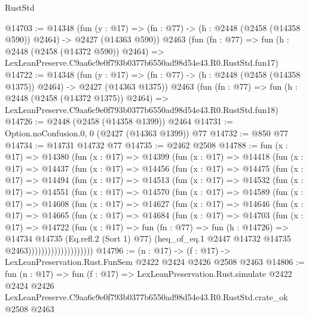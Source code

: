 \begin{lexlean}{RustStd}
\begin{coremodule}
@14703 := @14348
    (fun (y : @17) => (fn : @77) -> (h : @2448 (@2458 (@14358 @590)) @2464) -> @2427 (@14363 @590))
    @2463
    (fun (fn : @77) =>
    fun (h : @2448 (@2458 (@14372 @590)) @2464) =>
    LexLeanPreserve.C9aa6c9e0f793b0377b6550ad98d54e43.R0.RustStd.fun17)
@14722 := @14348
    (fun (y : @17) =>
    (fn : @77) -> (h : @2448 (@2458 (@14358 @1375)) @2464) -> @2427 (@14363 @1375))
    @2463
    (fun (fn : @77) =>
    fun (h : @2448 (@2458 (@14372 @1375)) @2464) =>
    LexLeanPreserve.C9aa6c9e0f793b0377b6550ad98d54e43.R0.RustStd.fun18)
@14726 := @2448 (@2458 (@14358 @1399)) @2464
@14731 := Option.noConfusion.{0, 0} (@2427 (@14363 @1399)) @77
@14732 := @850 @77
@14734 := @14731 @14732 @77
@14735 := @2462 @2508
@14788 := fun (x : @17) =>
  @14380
    (fun (x : @17) =>
    @14399
      (fun (x : @17) =>
      @14418
        (fun (x : @17) =>
        @14437
          (fun (x : @17) =>
          @14456
            (fun (x : @17) =>
            @14475
              (fun (x : @17) =>
              @14494
                (fun (x : @17) =>
                @14513
                  (fun (x : @17) =>
                  @14532
                    (fun (x : @17) =>
                    @14551
                      (fun (x : @17) =>
                      @14570
                        (fun (x : @17) =>
                        @14589
                          (fun (x : @17) =>
                          @14608
                            (fun (x : @17) =>
                            @14627
                              (fun (x : @17) =>
                              @14646
                                (fun (x : @17) =>
                                @14665
                                  (fun (x : @17) =>
                                  @14684
                                    (fun (x : @17) =>
                                    @14703
                                      (fun (x : @17) =>
                                      @14722
                                        (fun (x : @17) =>
                                        fun (fn : @77) =>
                                        fun (h : @14726) =>
                                        @14734
                                          @14735
                                          (Eq.refl.{2} (Sort 1) @77)
                                          (heq_of_eq.{1}
                                            @2447
                                            @14732
                                            @14735
                                            @2463))))))))))))))))))))
@14796 := (n : @17) -> (f : @17) -> LexLeanPreservation.Rust.FunSem @2422 @2424 @2426 @2508 @2463
@14806 := fun (n : @17) =>
  fun (f : @17) =>
  LexLeanPreservation.Rust.simulate
    @2422
    @2424
    @2426
    LexLeanPreserve.C9aa6c9e0f793b0377b6550ad98d54e43.R0.RustStd.crate_ok
    @2508
    @2463
\end{coremodule}
\end{lexlean}
